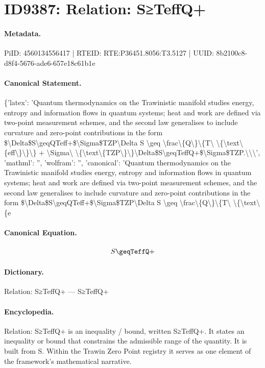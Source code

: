 \section*{ID9387: Relation: S≥TeffQ+}
\paragraph{Metadata.}
PiID: 4560134556417 | RTEID: RTE:P36451.8056:T3.5127 | UUID: 8b2100c8-d8f4-5676-ade6-657e18c61b1e

\paragraph{Canonical Statement.}
\{'latex': 'Quantum thermodynamics on the Trawinistic manifold studies energy, entropy and information flows in quantum systems; heat and work are defined via two-point measurement schemes, and the second law generalises to include curvature and zero-point contributions in the form \$\textbackslash{}Delta\$S\textbackslash{}geqQTeff+\$\textbackslash{}Sigma\$TZP\textbackslash{}Delta S \textbackslash{}geq \textbackslash{}frac\textbackslash{}\{Q\textbackslash{}\}\textbackslash{}\{T\textbackslash{} \textbackslash{}\{\textbackslash{}text\textbackslash{}\{eff\textbackslash{}\}\textbackslash{}\}\textbackslash{}\} + \textbackslash{}Sigma\textbackslash{} \textbackslash{}\{\textbackslash{}text\textbackslash{}\{TZP\textbackslash{}\}\textbackslash{}\}\textbackslash{}Delta\$S\textbackslash{}geqTeffQ+\$\textbackslash{}Sigma\$TZP.\textbackslash{}\textbackslash{}\textbackslash{}', 'mathml': '', 'wolfram': '', 'canonical': 'Quantum thermodynamics on the Trawinistic manifold studies energy, entropy and information flows in quantum systems; heat and work are defined via two-point measurement schemes, and the second law generalises to include curvature and zero-point contributions in the form \$\textbackslash{}Delta\$S\textbackslash{}geqQTeff+\$\textbackslash{}Sigma\$TZP\textbackslash{}Delta S \textbackslash{}geq \textbackslash{}frac\textbackslash{}\{Q\textbackslash{}\}\textbackslash{}\{T\textbackslash{} \textbackslash{}\{\textbackslash{}text\textbackslash{}\{e

\paragraph{Canonical Equation.}
\[
S\geqTeffQ+
\]

\paragraph{Dictionary.}
Relation: S≥TeffQ+ — S≥TeffQ+

\paragraph{Encyclopedia.}
Relation: S≥TeffQ+ is an inequality / bound, written S≥TeffQ+. It states an inequality or bound that constrains the admissible range of the quantity. It is built from S. Within the Trawin Zero Point registry it serves as one element of the framework's mathematical narrative.
